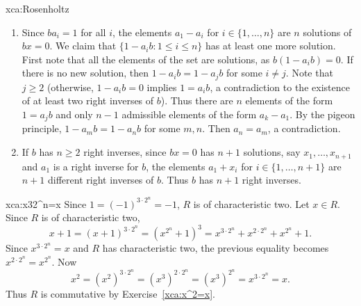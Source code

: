 \begin{sol}{xca:Rosenholtz}
\begin{enumerate}
    \item Since $ba_i=1$ for all $i$, the elements $a_1-a_i$ for $i\in\{1,\dots,n\}$ 
    are $n$ solutions of $bx=0$. We claim that $\{1-a_ib:1\leq i\leq n\}$ has at least
    one more solution. First note that all the elements of the set are solutions, as
    $b(1-a_ib)=0$. If there is no new solution, then $1-a_ib=1-a_jb$ for some $i\ne j$. Note that 
    $j\geq2$ (otherwise, $1-a_ib=0$ implies $1=a_ib$, a contradiction to the existence of at least 
    two right inverses of $b$). Thus there are $n$ elements of the form 
    $1=a_jb$ and only $n-1$ admissible elements of the form $a_k-a_1$. By the pigeon principle,
    $1-a_mb=1-a_nb$ for some $m,n$. Then $a_n=a_m$, a contradiction. 

    \item If $b$ has $n\geq2$ right inverses, since $bx=0$ 
    has $n+1$ solutions, say $x_1,\dots,x_{n+1}$ and $a_1$ is a right inverse for $b$, 
    the elements $a_1+x_i$ for $i\in\{1,\dots,n+1\}$ are $n+1$ different right inverses of $b$. Thus 
    $b$ has $n+1$ right inverses. 
\end{enumerate}
\end{sol}

\begin{sol}{xca:x32^n=x}
    Since $1=(-1)^{3\cdot 2^n}=-1$, $R$ is of characteristic two. Let $x\in R$. Since $R$ is of characteristic two,  
    \[
    x+1=(x+1)^{3\cdot 2^n}=(x^{2^n}+1)^3
    =x^{3\cdot 2^n}+x^{2\cdot 2^n}+x^{2^n}+1.
    \]
    Since $x^{3\cdot 2^n}=x$ and $R$ has characteristic two, 
    the previous equality becomes $x^{2\cdot 2^n}=x^{2^n}$.
    Now 
    \[
    x^2=(x^2)^{3\cdot 2^n}=(x^3)^{2\cdot 2^n}=(x^3)^{2^n}=x^{3\cdot 2^n}=x.
    \]
    Thus $R$ is commutative by Exercise~\ref{xca:x^2=x}.
\end{sol}

